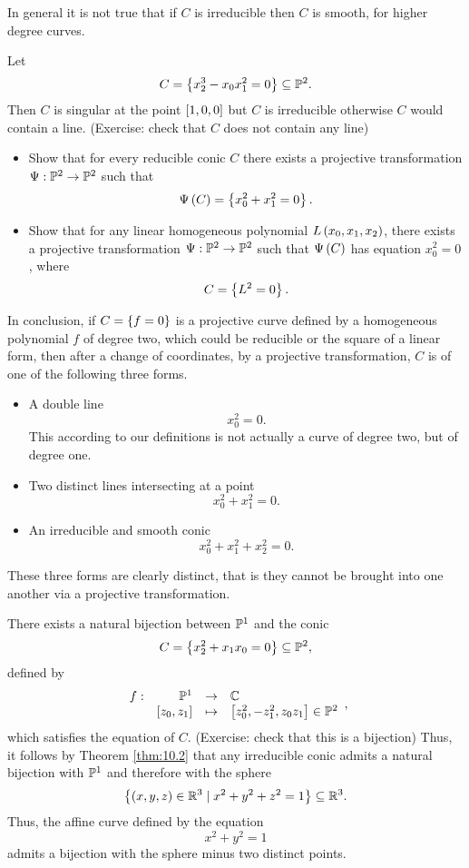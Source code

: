 \begin{remark}
In general it is not true that if $ C $ is irreducible then $ C $ is smooth, for higher degree curves.
\end{remark}

\begin{example}
Let
$$ C = \cb{x_2^3 - x_0x_1^2 = 0} \subseteq \P^2. $$
Then $ C $ is singular at the point $ \sb{1, 0, 0} $ but $ C $ is irreducible otherwise $ C $ would contain a line. (Exercise: check that $ C $ does not contain any line)
\end{example}

\begin{exercise}
\label{ex:30}
\hfill
\begin{itemize}
\item Show that for every reducible conic $ C $ there exists a projective transformation $ \Psi : \P^2 \to \P^2 $ such that
$$ \Psi\rb{C} = \cb{x_0^2 + x_1^2 = 0}. $$
\item Show that for any linear homogeneous polynomial $ L\rb{x_0, x_1, x_2} $, there exists a projective transformation $ \Psi : \P^2 \to \P^2 $ such that $ \Psi\rb{C} $ has equation $ x_0^2 = 0 $, where
$$ C = \cb{L^2 = 0}. $$
\end{itemize}
\end{exercise}

In conclusion, if $ C = \cb{f = 0} $ is a projective curve defined by a homogeneous polynomial $ f $ of degree two, which could be reducible or the square of a linear form, then after a change of coordinates, by a projective transformation, $ C $ is of one of the following three forms.
\begin{itemize}
\item A double line
$$ x_0^2 = 0. $$
This according to our definitions is not actually a curve of degree two, but of degree one.
\item Two distinct lines intersecting at a point
$$ x_0^2 + x_1^2 = 0. $$
\item An irreducible and smooth conic
$$ x_0^2 + x_1^2 + x_2^2 = 0. $$
\end{itemize}
These three forms are clearly distinct, that is they cannot be brought into one another via a projective transformation.

\begin{remark}
There exists a natural bijection between $ \P^1 $ and the conic
$$ C = \cb{x_2^2 + x_1x_0 = 0} \subseteq \P^2, $$
defined by
$$ \function[f]{\P^1}{\C}{\sb{z_0, z_1}}{\sb{z_0^2, -z_1^2, z_0z_1} \in \P^2}, $$
which satisfies the equation of $ C $. (Exercise: check that this is a bijection) Thus, it follows by Theorem \ref{thm:10.2} that any irreducible conic admits a natural bijection with $ \P^1 $ and therefore with the sphere
$$ \cb{\rb{x, y, z} \in \R^3 \mid x^2 + y^2 + z^2 = 1} \subseteq \R^3. $$
Thus, the affine curve defined by the equation
$$ x^2 + y^2 = 1 $$
admits a bijection with the sphere minus two distinct points.
\end{remark}

